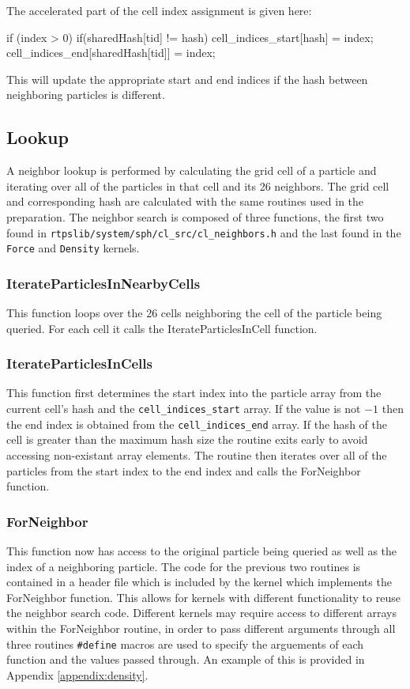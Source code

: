The accelerated part of the cell index assignment is given here:
\begin{cppcode}{0}
if (index > 0)
{
    if(sharedHash[tid] != hash)
    {
        cell_indices_start[hash] = index;
        cell_indices_end[sharedHash[tid]] = index;
    }
}
\end{cppcode}

This will update the appropriate start and end indices if the hash between
neighboring particles is different.

\subsection{Lookup}
A neighbor lookup is performed by calculating the grid cell of a particle and
iterating over all of the particles in that cell and its 26 neighbors. The grid
cell and corresponding hash are calculated with the same routines used in the
preparation. The neighbor search is composed of three functions, the first two
found in \verb|rtpslib/system/sph/cl_src/cl_neighbors.h| and the last found in
the \verb|Force| and \verb|Density| kernels.

\subsubsection{IterateParticlesInNearbyCells}
This function loops over the 26 cells neighboring the cell of the particle
being queried. For each cell it calls the IterateParticlesInCell function.

\subsubsection{IterateParticlesInCells}
This function first determines the start index into the particle array from the
current cell's hash and the \verb|cell_indices_start| array. If the value is
not $-1$ then the end index is obtained from the \verb|cell_indices_end| array.
If the hash of the cell is greater than the maximum hash size the routine exits
early to avoid accessing non-existant array elements. The routine then iterates
over all of the particles from the start index to the end index and calls the
ForNeighbor function.

\subsubsection{ForNeighbor}
This function now has access to the original particle being queried as well as
the index of a neighboring particle. The code for the previous two routines is
contained in a header file which is included by the kernel which implements the
ForNeighbor function. This allows for kernels with different functionality to
reuse the neighbor search code. Different kernels may require access to
different arrays within the ForNeighbor routine, in order to pass different
arguments through all three routines \verb|#define| macros are used to specify
the arguements of each function and the values passed through. An example of
this is provided in Appendix \ref{appendix:density}.

